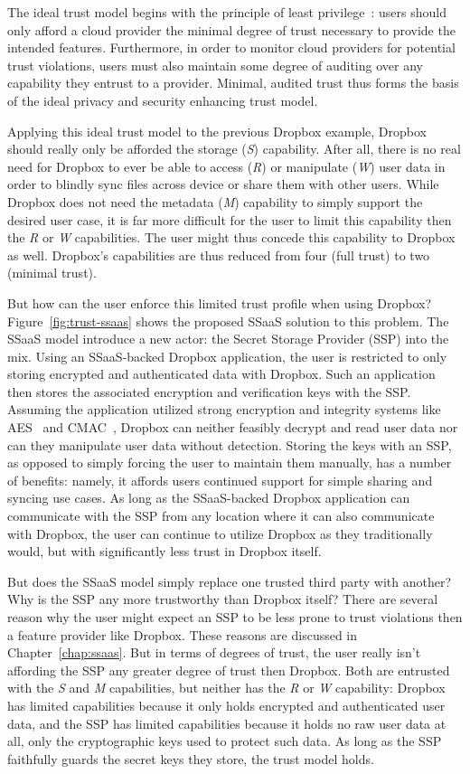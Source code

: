 The ideal trust model begins with the principle of least
privilege~\cite{saltzer1975}: users should only afford a cloud
provider the minimal degree of trust necessary to provide the intended
features. Furthermore, in order to monitor cloud providers for
potential trust violations, users must also maintain some degree of
auditing over any capability they entrust to a provider. Minimal,
audited trust thus forms the basis of the ideal privacy and security
enhancing trust model.

Applying this ideal trust model to the previous Dropbox example,
Dropbox should really only be afforded the storage (\emph{S})
capability. After all, there is no real need for Dropbox to ever be
able to access (\emph{R}) or manipulate (\emph{W}) user data in order
to blindly sync files across device or share them with other
users. While Dropbox does not need the metadata (\emph{M}) capability
to simply support the desired user case, it is far more difficult for
the user to limit this capability then the \emph{R} or \emph{W}
capabilities. The user might thus concede this capability to Dropbox
as well. Dropbox's capabilities are thus reduced from four (full
trust) to two (minimal trust).

But how can the user enforce this limited trust profile when using
Dropbox?  Figure~\ref{fig:trust-ssaas} shows the proposed SSaaS
solution to this problem. The SSaaS model introduce a new actor: the
Secret Storage Provider (SSP) into the mix. Using an SSaaS-backed
Dropbox application, the user is restricted to only storing encrypted
and authenticated data with Dropbox. Such an application then stores
the associated encryption and verification keys with the SSP. Assuming
the application utilized strong encryption and integrity systems like
AES~\cite{nist2001} and CMAC~\cite{dworkin2005}, Dropbox can neither
feasibly decrypt and read user data nor can they manipulate user data
without detection. Storing the keys with an SSP, as opposed to simply
forcing the user to maintain them manually, has a number of benefits:
namely, it affords users continued support for simple sharing and
syncing use cases. As long as the SSaaS-backed Dropbox application can
communicate with the SSP from any location where it can also
communicate with Dropbox, the user can continue to utilize Dropbox as
they traditionally would, but with significantly less trust in Dropbox
itself.

But does the SSaaS model simply replace one trusted third party with
another? Why is the SSP any more trustworthy than Dropbox itself?
There are several reason why the user might expect an SSP to be less
prone to trust violations then a feature provider like Dropbox. These
reasons are discussed in Chapter~\ref{chap:ssaas}. But in terms of
degrees of trust, the user really isn't affording the SSP any greater
degree of trust then Dropbox. Both are entrusted with the \emph{S} and
\emph{M} capabilities, but neither has the \emph{R} or \emph{W}
capability: Dropbox has limited capabilities because it only holds
encrypted and authenticated user data, and the SSP has limited
capabilities because it holds no raw user data at all, only the
cryptographic keys used to protect such data. As long as the SSP
faithfully guards the secret keys they store, the trust model
holds.

